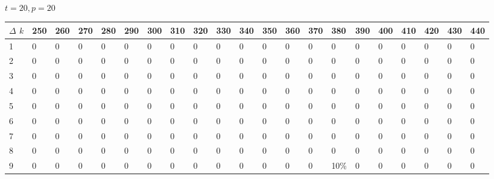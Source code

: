 \documentclass[11pt]{article}
\begin{document}
\paragraph{}
$t =  20, p =  20$
\begin{center} \tiny \begin{tabular}{|l |l |l |l |l |l |l |l |l |l |l |l |l |l |l |l |l |l |l |l |l |} \hline
$\Delta$ $k$ &250 & 260 & 270 & 280 & 290 & 300 & 310 & 320 & 330 & 340 & 350 & 360 & 370 & 380 & 390 & 400 & 410 & 420 & 430 & 440  \\ \hline
1 & 0 & 0 & 0 & 0 & 0 & 0 & 0 & 0 & 0 & 0 & 0 & 0 & 0 & 0 & 0 & 0 & 0 & 0 & 0 & 0  \\ \hline
2 & 0 & 0 & 0 & 0 & 0 & 0 & 0 & 0 & 0 & 0 & 0 & 0 & 0 & 0 & 0 & 0 & 0 & 0 & 0 & 0  \\ \hline
3 & 0 & 0 & 0 & 0 & 0 & 0 & 0 & 0 & 0 & 0 & 0 & 0 & 0 & 0 & 0 & 0 & 0 & 0 & 0 & 0  \\ \hline
4 & 0 & 0 & 0 & 0 & 0 & 0 & 0 & 0 & 0 & 0 & 0 & 0 & 0 & 0 & 0 & 0 & 0 & 0 & 0 & 0  \\ \hline
5 & 0 & 0 & 0 & 0 & 0 & 0 & 0 & 0 & 0 & 0 & 0 & 0 & 0 & 0 & 0 & 0 & 0 & 0 & 0 & 0  \\ \hline
6 & 0 & 0 & 0 & 0 & 0 & 0 & 0 & 0 & 0 & 0 & 0 & 0 & 0 & 0 & 0 & 0 & 0 & 0 & 0 & 0  \\ \hline
7 & 0 & 0 & 0 & 0 & 0 & 0 & 0 & 0 & 0 & 0 & 0 & 0 & 0 & 0 & 0 & 0 & 0 & 0 & 0 & 0  \\ \hline
8 & 0 & 0 & 0 & 0 & 0 & 0 & 0 & 0 & 0 & 0 & 0 & 0 & 0 & 0 & 0 & 0 & 0 & 0 & 0 & 0  \\ \hline
9 & 0 & 0 & 0 & 0 & 0 & 0 & 0 & 0 & 0 & 0 & 0 & 0 & 0 & 10\% & 0 & 0 & 0 & 0 & 0 & 0  \\ \hline
\end{tabular}\end{center}
\end{document}
